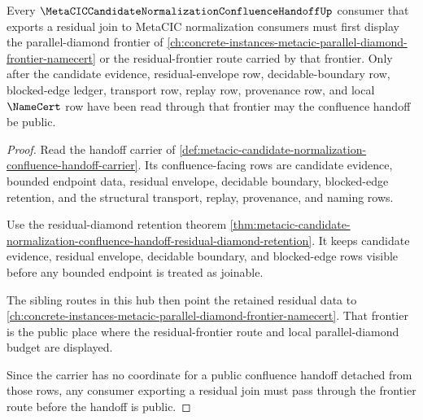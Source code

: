 \begin{theorem}
\label{thm:metacic-candidate-normalization-confluence-handoff-forward-link}
Every $\MetaCICCandidateNormalizationConfluenceHandoffUp$ consumer that exports a residual join to MetaCIC normalization consumers must first display the parallel-diamond frontier of \autoref{ch:concrete-instances-metacic-parallel-diamond-frontier-namecert} or the residual-frontier route carried by that frontier. Only after the candidate evidence, residual-envelope row, decidable-boundary row, blocked-edge ledger, transport row, replay row, provenance row, and local $\NameCert$ row have been read through that frontier may the confluence handoff be public.
\end{theorem}
\begin{proof}
Read the handoff carrier of \autoref{def:metacic-candidate-normalization-confluence-handoff-carrier}. Its confluence-facing rows are candidate evidence, bounded endpoint data, residual envelope, decidable boundary, blocked-edge retention, and the structural transport, replay, provenance, and naming rows.

Use the residual-diamond retention theorem \autoref{thm:metacic-candidate-normalization-confluence-handoff-residual-diamond-retention}. It keeps candidate evidence, residual envelope, decidable boundary, and blocked-edge rows visible before any bounded endpoint is treated as joinable.

The sibling routes in this hub then point the retained residual data to \autoref{ch:concrete-instances-metacic-parallel-diamond-frontier-namecert}. That frontier is the public place where the residual-frontier route and local parallel-diamond budget are displayed.

Since the carrier has no coordinate for a public confluence handoff detached from those rows, any consumer exporting a residual join must pass through the frontier route before the handoff is public.
\end{proof}
